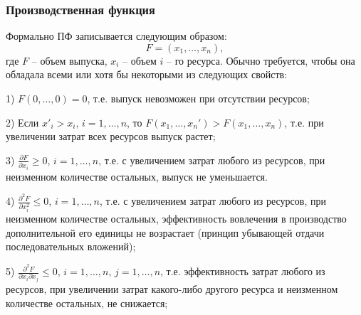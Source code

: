 \documentclass[10pt, pdf, hyperref={unicode}]{beamer}
\begin{document}
    \begin{frame}
        \frametitle{Производственная функция}
        \begin{center}
            \begin{minipage}[h]{0.97\linewidth}
                Формально ПФ записывается следующим образом:
                \begin{equation}\label{f13}
                F=(x_1,\dots,x_n),
                \end{equation}
                где $F$ -- объем выпуска, $x_i$ -- объем $i$ -- го ресурса.
                Обычно требуется, чтобы она обладала всеми или
                хотя бы некоторыми из следующих свойств:

                1) $F(0,\dots,0)=0$, т.е. выпуск невозможен при отсутствии ресурсов;

                2) Если $x'_i>x_i$, $i=1,\dots,n$, то
                $F(x_1,\dots,x_n')>F(x_1,\dots,x_n)$, т.е. при увеличении затрат
                всех ресурсов выпуск растет;

                3) $\frac{\partial F}{\partial x_i}\ge0$, $i=1,\dots,n$, т.е. с
                увеличением затрат любого из ресурсов, при неизменном количестве
                остальных, выпуск не уменьшается.

                4) $\frac{\partial^2 F}{\partial x_i^2}\le0$, $i=1,\dots,n$, т.е. с
                увеличением затрат любого из ресурсов, при неизменном количестве
                остальных, эффективность вовлечения в производство дополнительной
                его единицы не возрастает (принцип убывающей отдачи последовательных
                вложений);

                5) $\frac{\partial^2 F}{\partial x_i\partial x_j}\le0$,
                $i=1,\dots,n$, $j=1,\dots,n$, т.е. эффективность затрат любого из
                ресурсов, при увеличении затрат какого-либо другого ресурса и
                неизменном количестве остальных, не снижается;
            \end{minipage}
        \end{center}
    \end{frame}
\end{document}
